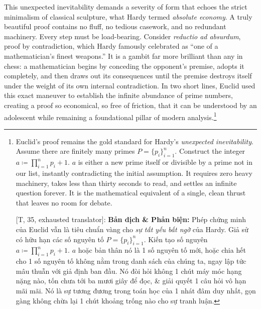 \documentclass[11pt]{article}
\begin{document}
This unexpected inevitability demands a severity of form that echoes the strict minimalism of classical sculpture, what Hardy termed \emph{absolute economy}. A truly beautiful proof contains no fluff, no tedious casework, and no redundant machinery. Every step must be load-bearing. Consider \textit{reductio ad absurdum}, proof by contradiction, which Hardy famously celebrated as ``one of a mathematician's finest weapons.'' It is a gambit far more brilliant than any in chess: a mathematician begins by conceding the opponent's premise, adopts it completely, and then draws out its consequences until the premise destroys itself under the weight of its own internal contradiction. In two short lines, Euclid used this exact maneuver to establish the infinite abundance of prime numbers, creating a proof so economical, so free of friction, that it can be understood by an adolescent while remaining a foundational pillar of modern analysis.\footnote{Euclid's proof remains the gold standard for Hardy's \textit{unexpected inevitability}. Assume there are finitely many primes $P = \{p_i\}_{i=1}^n$. Construct the integer $a\coloneqq\prod_{i=1}^n p_i + 1$. $a$ is either a new prime itself or divisible by a prime not in our list, instantly contradicting the initial assumption. It requires zero heavy machinery, takes less than thirty seconds to read, and settles an infinite question forever. It is the mathematical equivalent of a single, clean thrust that leaves no room for debate.
	
	\textsf{[T, 35, exhausted translator]:} \textbf{Bản dịch \& Phản biện:} Phép chứng minh của Euclid vẫn là tiêu chuẩn vàng cho \textit{sự tất yếu bất ngờ} của Hardy. Giả sử có hữu hạn các số nguyên tố $P = \{p_i\}_{i=1}^n$. Kiến tạo số nguyên $a\coloneqq\prod_{i=1}^n p_i + 1$. $a$ hoặc bản thân nó là 1 số nguyên tố mới, hoặc chia hết cho 1 số nguyên tố không nằm trong danh sách của chúng ta, ngay lập tức mâu thuẫn với giả định ban đầu. Nó đòi hỏi không 1 chút máy móc hạng nặng nào, tốn chưa tới ba mươi giây để đọc, \& giải quyết 1 câu hỏi vô hạn mãi mãi. Nó là sự tương đương trong toán học của 1 nhát đâm duy nhất, gọn gàng không chừa lại 1 chút khoảng trống nào cho sự tranh luận.}
\end{document}

